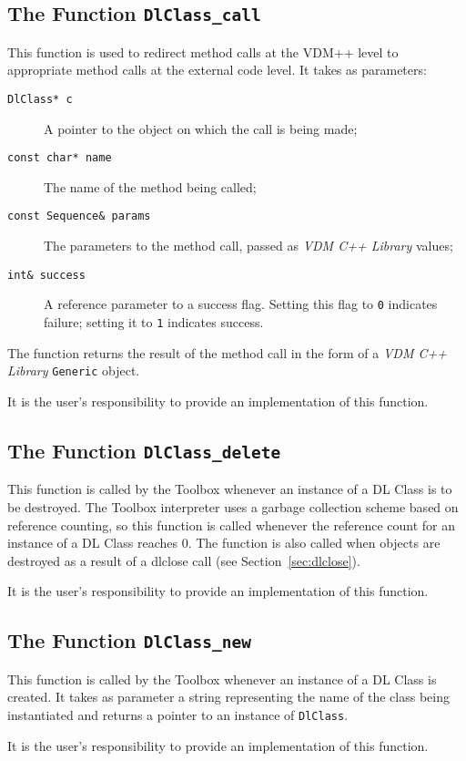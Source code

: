 \documentclass[\pformat,12pt]{article}
\newcommand{\vdmcpplib}{\textit{VDM C++ Library}}
\begin{document}
\subsection{The Function \texttt{DlClass\_call}}
This function is used to redirect method calls at the VDM++ level to
appropriate method calls at the external code level. It takes as
parameters: 
\begin{description}
\item[\texttt{DlClass* c}] A pointer to the object on which the call
is being made;
\item[\texttt{const char* name}] The name of the method being called;
\item[\texttt{const Sequence\& params}] The parameters to the method call,
passed as {\vdmcpplib} values;
\item[\texttt{int\& success}] A reference parameter to a success flag.
Setting this flag to \texttt{0} indicates failure; setting it to
\texttt{1} indicates success.
\end{description}
The function returns the result of the method call in the form of a
{\vdmcpplib} \texttt{Generic} object.

It is the user's responsibility to provide an implementation of this
function. 
\subsection{The Function \texttt{DlClass\_delete}}
This function is called by the Toolbox whenever an instance of a DL
Class is to be destroyed. The Toolbox interpreter uses a garbage
collection scheme based on reference counting, so this function is called
whenever the reference count for an instance of a DL Class reaches 0. 
The function is also called when objects are destroyed as a result of
a \textsf{dlclose} call (see Section~\ref{sec:dlclose}).

It is the user's responsibility to provide an implementation of this
function. 

\subsection{The Function \texttt{DlClass\_new}}
This function is called by the Toolbox whenever an instance of a DL
Class is created. It takes as parameter a string representing the name
of the class being instantiated and returns a pointer to an instance
of \texttt{DlClass}. 

It is the user's responsibility to provide an
implementation of this function.
\end{document}
